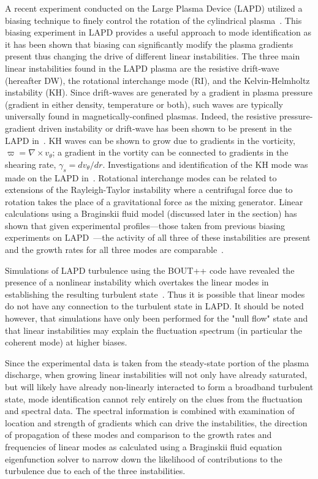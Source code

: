 \documentclass[aip,pop,amsmath,amssymb,reprint,superscriptaddress]{revtex4-1} %
\begin{document}
A recent experiment conducted on the Large Plasma Device (LAPD) utilized a biasing technique to finely control the rotation of the cylindrical plasma~\cite{schaffner12}. This biasing experiment in LAPD provides a useful approach to mode identification as it has been shown that biasing can significantly modify the plasma gradients present thus changing the drive of different linear instabilities. The three main linear instabilities found in the LAPD plasma are the resistive drift-wave (hereafter DW), the rotational interchange mode (RI), and the Kelvin-Helmholtz instability (KH). Since drift-waves are generated by a gradient in plasma pressure (gradient in either density, temperature or both), such waves are typically universally found in magnetically-confined plasmas. Indeed, the resistive pressure-gradient driven instability or drift-wave has been shown to be present in the LAPD in~\cite{penano00}.  KH waves can be shown to grow due to gradients in the vorticity, $\varpi = \nabla \times v_{\theta}$; a gradient in the vortity can be connected to gradients in the shearing rate, $\gamma_{s} = dv_{\theta}/dr$. Investigations and identification of the KH mode was made on the LAPD in~\cite{horton04,perez06}. Rotational interchange modes can be related to extensions of the Rayleigh-Taylor instability where a centrifugal force due to rotation takes the place of a gravitational force as the mixing generator. Linear calculations using a Braginskii fluid model (discussed later in the section) has shown that given experimental profiles---those taken from previous biasing experiments on LAPD~\cite{maggs07,carter09}---the activity of all three of these instabilities are present and the growth rates for all three modes are comparable~\cite{popovich10}. 

Simulations of LAPD turbulence using the BOUT++ code have revealed the presence of a nonlinear instability which overtakes the linear modes in establishing the resulting turbulent state~\cite{friedman12}. Thus it is possible that linear modes do not have any connection to the turbulent state in LAPD.  It should be noted however, that simulations have only been performed for the "null flow" state and that linear instabilities may explain the fluctuation spectrum (in particular the coherent mode) at higher biases.

Since the experimental data is taken from the steady-state portion of the plasma discharge, when growing linear instabilities will not only have already saturated, but will likely have already non-linearly interacted to form a broadband turbulent state, mode identification cannot rely entirely on the clues from the fluctuation and spectral data. The spectral information is combined with examination of location and strength of gradients which can drive the instabilities, the direction of propagation of these modes and comparison to the growth rates and frequencies of linear modes as calculated using a Braginskii fluid equation eigenfunction solver to narrow down the likelihood of contributions to the turbulence due to each of the three instabilities.
\end{document}
